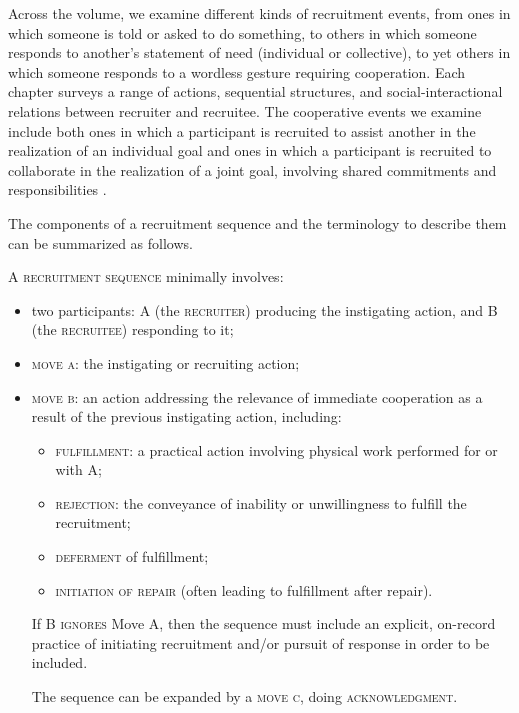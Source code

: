 \documentclass[output=paper,modfonts,nonflat]{langsci/langscibook}
\begin{document}
Across the volume, we examine different kinds of recruitment events, from ones in which someone is told or asked to do something, to others in which someone responds to another’s statement of need (individual or collective), to yet others in which someone responds to a wordless gesture requiring cooperation. Each chapter surveys a range of actions, sequential structures, and social-interactional relations between recruiter and recruitee. The cooperative events we examine include both ones in which a participant is recruited to assist another in the realization of an individual goal and ones in which a participant is recruited to collaborate in the realization of a joint goal, involving shared commitments and responsibilities \citep{Enfield2014b,ZinkenRossi2016}.

The components of a recruitment sequence and the terminology to describe them can be summarized as follows.

A \textsc{recruitment sequence} minimally involves:

\begin{itemize}
\item two participants: \textsc{A} (the \textsc{recruiter}) producing the instigating action, and \textsc{B} (the \textsc{recruitee}) responding to it;
\item \textsc{move a}: the instigating or recruiting action;
\item \textsc{move b}: an action addressing the relevance of immediate cooperation as a result of the previous instigating action, including:

\begin{itemize}
\item \textsc{fulfillment}: a practical action involving physical work performed for or with A;
\item \textsc{rejection}: the conveyance of inability or unwillingness to fulfill the recruitment;
\item \textsc{deferment} of fulfillment;
\item \textsc{initiation of repair} (often leading to fulfillment after repair).
\end{itemize}

If B \textsc{ignores} Move A, then the sequence must include an explicit, on-record practice of initiating recruitment and/or pursuit of response in order to be included.

The sequence can be expanded by a \textsc{move c}, doing \textsc{acknowledgment}.
\end{itemize}
\end{document}
